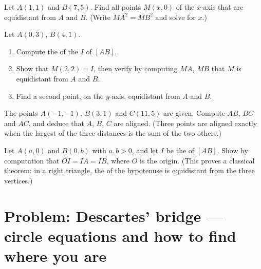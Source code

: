 \begin{exercise}[$\star\star$]\label{exo:g10:coordgeom:7}
Let $A(1, 1)$ and $B(7, 5)$. Find all points $M(x, 0)$ of the $x$-axis
that are equidistant from $A$ and $B$. (Write $MA^2 = MB^2$ and solve for
$x$.)
\end{exercise}

\begin{exercise}[$\star\star$]\label{exo:g10:coordgeom:8}
Let $A(0, 3)$, $B(4, 1)$.
\begin{enumerate}
  \item Compute the  of the  $I$ of $[AB]$.
  \item Show that $M(2, 2) = I$, then verify by computing $MA$, $MB$ that
        $M$ is equidistant from $A$ and $B$.
  \item Find a second point, on the $y$-axis, equidistant from $A$ and
        $B$.
\end{enumerate}
\end{exercise}

\begin{exercise}[$\star\star$]\label{exo:g10:coordgeom:9}
The points $A(-1, -1)$, $B(3, 1)$ and $C(11, 5)$ are given. Compute $AB$,
$BC$ and $AC$, and deduce that $A$, $B$, $C$ are aligned. (Three points
are aligned exactly when the largest of the three distances is the sum of
the two others.)
\end{exercise}

\begin{exercise}[$\star\star\star$]\label{exo:g10:coordgeom:10}
Let $A(a, 0)$ and $B(0, b)$ with $a, b > 0$, and let $I$ be the 
of $[AB]$. Show by computation that $OI = IA = IB$, where $O$ is the
origin. (This proves a classical theorem: in a right triangle, the
 of the hypotenuse is equidistant from the three vertices.)
\end{exercise}

\section{Problem: Descartes' bridge --- circle equations and how
to find where you are}

